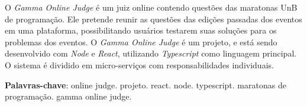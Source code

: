 \begin{resumo}

    O \textit{Gamma Online Judge} é um juiz online contendo questões das maratonas UnB de programação. Ele pretende reunir as questões das edições passadas dos eventos em uma plataforma, possibilitando usuários testarem suas soluções para os problemas dos eventos. O \textit{Gamma Online Judge} é um projeto, e está sendo desenvolvido com \textit{Node} e \textit{React}, utilizando \textit{Typescript} como linguagem principal. O sistema é dividido em micro-serviços com responsabilidades individuais.

 \vspace{\onelineskip}
    
 \noindent
 \textbf{Palavras-chave}: online judge. projeto. react. node. typescript. maratonas de programação. gamma online judge.
\end{resumo}
